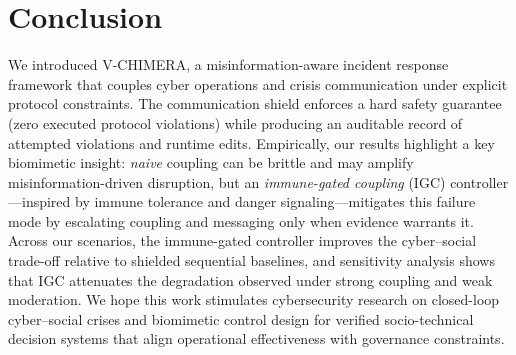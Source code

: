\documentclass[biomimetics,article,submit,pdftex,moreauthors]{Definitions/mdpi}
\newcommand{\model}{V-CHIMERA}
\begin{document}
\section{Conclusion}
We introduced \model{}, a misinformation-aware incident response framework that couples cyber operations and crisis communication under explicit protocol constraints.
The communication shield enforces a hard safety guarantee (zero executed protocol violations) while producing an auditable record of attempted violations and runtime edits.
Empirically, our results highlight a key biomimetic insight: \emph{naive} coupling can be brittle and may amplify misinformation-driven disruption, but an \emph{immune-gated coupling} (IGC) controller---inspired by immune tolerance and danger signaling---mitigates this failure mode by escalating coupling and messaging only when evidence warrants it.
Across our scenarios, the immune-gated controller improves the cyber--social trade-off relative to shielded sequential baselines, and sensitivity analysis shows that IGC attenuates the degradation observed under strong coupling and weak moderation.
We hope this work stimulates cybersecurity research on closed-loop cyber--social crises and biomimetic control design for verified socio-technical decision systems that align operational effectiveness with governance constraints.

\vspace{6pt} 



\end{document}
